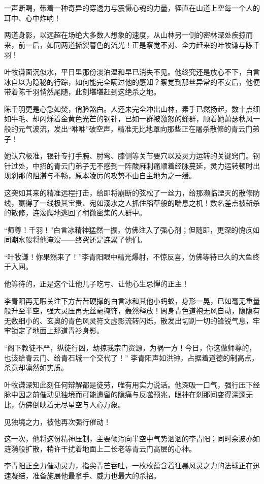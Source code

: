一声断喝，带着一种奇异的穿透力与震慑心魂的力量，径直在山道上空每一个人的耳中、心中炸响！

两道身影，以远超在场绝大多数人想象的速度，从山林另一侧的密林深处疾掠而来，前一后，如同两道撕裂暮色的流光！正是察觉不对、全力赶来的叶牧谦与陈千羽！

叶牧谦面沉似水，平日里那份淡泊温和早已消失不见。他终究还是放心不下，白言冰自以为隐秘的行踪，如何能完全瞒过他的感知？察觉到那丝异常的不安后，他便带着陈千羽悄然尾随，此刻堪堪赶到这绝杀之地。

陈千羽更是心急如焚，俏脸煞白。人还未完全冲出山林，素手已然扬起，数十点细如牛毛、却闪烁着金黄色光芒的钢针，已如一群被激怒的蜂群，顺着她萧瑟秋风一般的元气波流，发出“咻咻”破空声，精准无比地罩向那些正在屠杀散修的青云门弟子！

她认穴极准，银针专打手腕、肘弯、膝侧等关节要穴以及灵力运转的关键窍门。钢针过处，中招的青云门弟子无不感到一阵酸麻刺痛顺着经脉蔓延，灵力运转顿时出现刹那的阻滞与不畅，原本凌厉的攻势不由自主地为之一缓。

这突如其来的精准远程打击，给即将崩断的弦松了一丝力，给那濒临湮灭的散修防线，赢得了一线极其宝贵、宛如溺水之人抓住稻草般的喘息之机！数名差点被斩杀的散修，连滚爬地逃回了稍微密集的人群中。

“师尊！千羽！”白言冰精神猛然一振，仿佛注入了强心剂；但随即，更深的愧疚如同潮水般将他淹没——终究还是连累了他们。

“叶牧谦！你果然来了！”李青阳眼中精光爆射，不惊反喜，仿佛等待已久的大鱼终于入网。

他等待的，正是这个让他儿子吃亏、让他心生忌惮的正主！

李青阳再无暇关注下方苦苦硬撑的白言冰和其他小蚂蚁，身形一晃，已如毫无重量般升至半空，强大灵压再无丝毫掩饰，轰然释放！周身青色道袍无风自动，隐隐有无数细小的、玄奥的青色风灵符文虚影流转闪烁，散发出切割一切的锋锐气息，牢牢锁定了地面上那道青衫身影。

“阁下教徒不严，纵徒行凶，劫掠我宗门资源，为祸一方！今日，你这做师尊的，也该给青云门、给青石城一个交代了！” 李青阳声如洪钟，占据着道德的制高点，杀意却凛然如实质。

叶牧谦深知此刻任何辩解都是徒劳，唯有用实力说话。他深吸一口气，强行压下经脉中因之前催动见独境而可能遗留的隐痛与反噬预兆，眼神在刹那间变得深邃无比，仿佛倒映着无尽星空与人心万象。

见独境之力，被他再次强行催动！

这一次，他将这份精神压制，主要倾泻向半空中气势汹汹的李青阳；同时余波亦如涟漪般扩散，稍许干扰着地面上二长老等青云门高层的心神。

李青阳正全力催动灵力，指尖青芒吞吐，一枚枚蕴含着狂暴风灵之力的法球正在迅速凝结，准备施展他最拿手、威力也最大的杀招。


